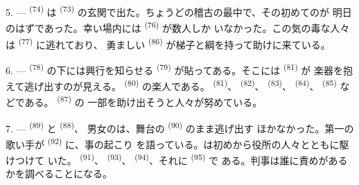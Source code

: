 \VUsaut{5.0mm}
\VUsaut{3.4mm}

5. ---  \textsuperscript{(74)} は \textsuperscript{(73)}
の玄関で出た。ちょうどの稽古の最中で、その初めてのが
明日のはずであった。幸い場内には \textsuperscript{(76)} が数人しか
いなかった。この気の毒な人々は \textsuperscript{(77)} に逃れており、
勇ましい \textsuperscript{(86)} が梯子と綱を持って助けに来ている。

6. ---  \textsuperscript{(78)} の下には興行を知らせる
\textsuperscript{(79)} が貼ってある。そこには \textsuperscript{(81)} が
楽器を抱えて逃げ出すのが見える。 \textsuperscript{(80)} の楽人である。
 \textsuperscript{(81)}、 \textsuperscript{(82)}、
 \textsuperscript{(83)}、 \textsuperscript{(84)}、
 \textsuperscript{(85)} などである。 \textsuperscript{(87)} の
一部を助け出そうと人々が努めている。

7. ---  \textsuperscript{(89)} と \textsuperscript{(88)}、
男女のは、舞台の \textsuperscript{(90)} のまま逃げ出す
ほかなかった。第一の歌い手が \textsuperscript{(92)} に、事の起こり
を語っている。は初めから役所の人々とともに駆けつけて
いた。 \textsuperscript{(91)}、 \textsuperscript{(93)}、
 \textsuperscript{(94)}、それに \textsuperscript{(95)} で
ある。判事は誰に責めがあるかを調べることになる。
\VUsaut{6.0mm}
\VUfilet{22mm}
